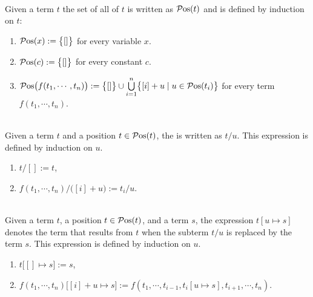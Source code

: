 \begin{Definition} \hspace*{\fill} \\
  Given a term $t$ the set of all  of $t$ is written as $\mathcal{P}\mathrm{os}(t)$ and is defined by
  induction on $t$:
  \begin{enumerate}
  \item $\mathcal{P}\mathrm{os}(x) := \bigl\{ [] \bigr\}$ \quad for every variable $x$.
  \item $\mathcal{P}\mathrm{os}(c) := \bigl\{ [] \bigr\}$ \quad for every constant $c$.
  \item $\mathcal{P}\mathrm{os}\bigl(f(t_1,\cdots,t_n)\bigr) := 
         \bigl\{ [] \bigr\} \cup \bigcup\limits_{i=1}^n \bigl\{ [i] + u \mid u \in \mathcal{P}\mathrm{os}(t_i) \bigr\}$ 
        \quad for every term $f(t_1,\cdots,t_n)$. \eoxs
  \end{enumerate}
\end{Definition}

\begin{Definition} \hspace*{\fill} \\
  Given a term $t$ and a position $t \in \mathcal{P}\mathrm{os}(t)$, the  is
  written as $t/u$.  This expression is defined by induction on $u$.
  \begin{enumerate}
  \item $t/[] := t$,
  \item $f(t_1,\cdots,t_n)/\bigl([i]+u\bigr) := t_i/u$.  \eoxs
  \end{enumerate}
\end{Definition}
\pagebreak

\begin{Definition} \hspace*{\fill} \\
  Given a term $t$, a position $t \in \mathcal{P}\mathrm{os}(t)$, and a term $s$, the expression
  $t[u \mapsto s]$ denotes the term that results from $t$ when the subterm $t/u$ is replaced by the term 
  $s$.  This expression is defined by induction on $u$.
  \begin{enumerate}
  \item $t\bigl[ [] \mapsto s \bigr] := s$,
  \item $f(t_1,\cdots,t_n)\bigl[ [i]+u \mapsto s \bigr] := f(t_1, \cdots, t_{i-1},t_i[u \mapsto s], t_{i+1},\cdots, t_n)$.  
        \eoxs
  \end{enumerate}
\end{Definition}
  
